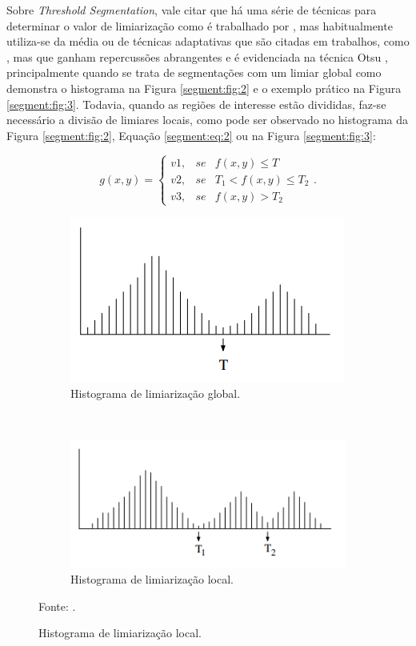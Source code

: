Sobre \textit{Threshold Segmentation}, vale citar que há uma série de técnicas para determinar o valor de limiarização como é trabalhado por \cite{Al-amri2010}, mas habitualmente utiliza-se da média \cite{Al-amri2010, Yanowitz1989, Yuheng2017} ou de técnicas adaptativas que são citadas em trabalhos, como \cite{Yanowitz1989}, mas que ganham repercussões abrangentes e é evidenciada na técnica Otsu \cite{Otsu1979}, principalmente quando se trata de segmentações com um limiar global como demonstra o histograma na Figura \ref{segment:fig:2} e o exemplo prático na Figura  \ref{segment:fig:3}. Todavia, quando as regiões de interesse estão divididas, faz-se necessário a divisão de limiares locais, como pode ser observado no histograma da Figura \ref{segment:fig:2}, Equação \ref{segment:eq:2} ou na Figura \ref{segment:fig:3}:

\begin{equation}
\label{segment:eq:2}
    g(x,y) = \left\{\begin{matrix}
        v1, & se & f(x,y) \leq T \\ 
        v2, & se & T_1 < f(x,y) \leq T_2 \\
        v3, & se & f(x,y) > T_2
\end{matrix}\right..
\end{equation}

\begin{figure}[H]
   \caption{Histogramas de limiarizações.}
   \centering
   \label{segment:fig:2}
    \begin{subfigure}[t]{0.45\textwidth}
        \centering
        \includegraphics[width=0.5\linewidth]{recursos/imagens/image_seg/limi_glob.png}
        \caption{Histograma de limiarização global.}
        \label{segment:fig:2.1}
    \end{subfigure}%
    ~ 
    \begin{subfigure}[t]{0.45\textwidth}
        \centering
        \includegraphics[width=0.5\linewidth]{recursos/imagens/image_seg/limi_local.png}
        \caption{Histograma de limiarização local.}
        \label{segment:fig:2.2}
    \end{subfigure}%

    Fonte: \cite{pedrini2008analise}.
\end{figure}

